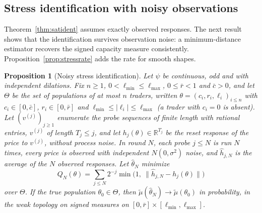 \documentclass[12pt]{article}
\newtheorem{proposition}[theorem]{Proposition}
\theoremstyle{definition}
\theoremstyle{remark}
\begin{document}
\subsection{Stress identification with noisy observations}\label{app:noisystress}

Theorem~\ref{thm:satident} assumes exactly observed responses. The next result shows that the identification survives observation noise: a minimum-distance estimator recovers the signed capacity measure consistently. Proposition~\ref{prop:stressrate} adds the rate for smooth shapes.

\begin{proposition}[Noisy stress identification]\label{prop:noisystress}
Let $\psi$ be continuous, odd and with independent dilations. Fix $n\ge1$, $0<\ell_{\min}\le\ell_{\max}$, $0\le\bar r<1$ and $\bar c>0$, and let $\Theta$ be the set of populations of at most $n$ traders, written $\theta=(c_i,r_i,\ell_i)_{i\le n}$ with $c_i\in[0,\bar c]$, $r_i\in[0,\bar r]$ and $\ell_{\min}\le|\ell_i|\le\ell_{\max}$ (a trader with $c_i=0$ is absent). Let $(v^{(j)})_{j\ge1}$ enumerate the probe sequences of finite length with rational entries, $v^{(j)}$ of length $T_j\le j$, and let $h_j(\theta)\in\mathbb R^{T_j}$ be the reset response of the price to $v^{(j)}$, without process noise. In round $N$, each probe $j\le N$ is run $N$ times, every price is observed with independent $N(0,\sigma^2)$ noise, and $\hat h_{j,N}$ is the average of the $N$ observed responses. Let $\hat\theta_N$ minimize
\[
 Q_N(\theta)=\sum_{j\le N}2^{-j}\min\bigl(1,\ \|\hat h_{j,N}-h_j(\theta)\|\bigr)
\]
over $\Theta$. If the true population $\theta_0\in\Theta$, then $\tilde\mu(\hat\theta_N)\to\tilde\mu(\theta_0)$ in probability, in the weak topology on signed measures on $[0,\bar r]\times[\ell_{\min},\ell_{\max}]$.
\end{proposition}
\end{document}
